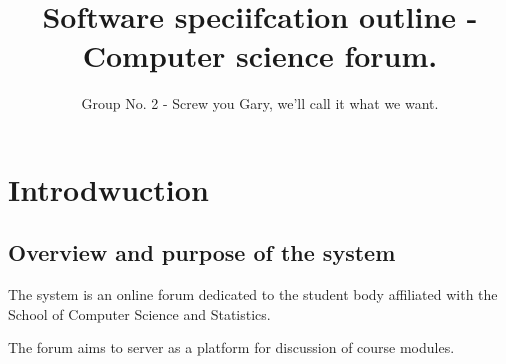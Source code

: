 \documentclass[a4paper, 12pt]{article}
\begin{document}
	\title{Software speciifcation outline - Computer science forum.}
	\author{Group No. 2 - Screw you Gary, we'll call it what we want.}
	\maketitle
	\section{Introdwuction}
		\subsection{Overview and purpose of the system}
			\par The system is an online forum dedicated to the student body affiliated with
			the School of Computer Science and Statistics. 
			\par The forum aims to server as a platform for discussion of course modules.
\end{document}
